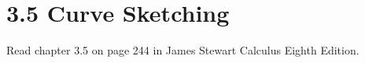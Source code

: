 %
%

\section*{3.5 Curve Sketching}

Read chapter 3.5 on page 244 in James Stewart Calculus Eighth Edition. 
